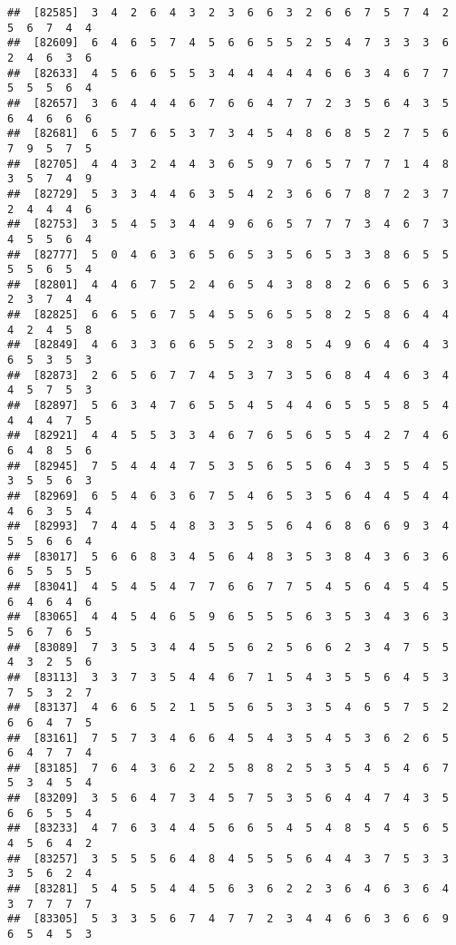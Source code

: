 \documentclass[
]{book}
\begin{document}
\begin{verbatim}
##  [82585]  3  4  2  6  4  3  2  3  6  6  3  2  6  6  7  5  7  4  2  5  6  7  4  4
##  [82609]  6  4  6  5  7  4  5  6  6  5  5  2  5  4  7  3  3  3  6  2  4  6  3  6
##  [82633]  4  5  6  6  5  5  3  4  4  4  4  4  6  6  3  4  6  7  7  5  5  5  6  4
##  [82657]  3  6  4  4  4  6  7  6  6  4  7  7  2  3  5  6  4  3  5  6  4  6  6  6
##  [82681]  6  5  7  6  5  3  7  3  4  5  4  8  6  8  5  2  7  5  6  7  9  5  7  5
##  [82705]  4  4  3  2  4  4  3  6  5  9  7  6  5  7  7  7  1  4  8  3  5  7  4  9
##  [82729]  5  3  3  4  4  6  3  5  4  2  3  6  6  7  8  7  2  3  7  2  4  4  4  6
##  [82753]  3  5  4  5  3  4  4  9  6  6  5  7  7  7  3  4  6  7  3  4  5  5  6  4
##  [82777]  5  0  4  6  3  6  5  6  5  3  5  6  5  3  3  8  6  5  5  5  5  6  5  4
##  [82801]  4  4  6  7  5  2  4  6  5  4  3  8  8  2  6  6  5  6  3  2  3  7  4  4
##  [82825]  6  6  5  6  7  5  4  5  5  6  5  5  8  2  5  8  6  4  4  4  2  4  5  8
##  [82849]  4  6  3  3  6  6  5  5  2  3  8  5  4  9  6  4  6  4  3  6  5  3  5  3
##  [82873]  2  6  5  6  7  7  4  5  3  7  3  5  6  8  4  4  6  3  4  4  5  7  5  3
##  [82897]  5  6  3  4  7  6  5  5  4  5  4  4  6  5  5  5  8  5  4  4  4  4  7  5
##  [82921]  4  4  5  5  3  3  4  6  7  6  5  6  5  5  4  2  7  4  6  6  4  8  5  6
##  [82945]  7  5  4  4  4  7  5  3  5  6  5  5  6  4  3  5  5  4  5  3  5  5  6  3
##  [82969]  6  5  4  6  3  6  7  5  4  6  5  3  5  6  4  4  5  4  4  4  6  3  5  4
##  [82993]  7  4  4  5  4  8  3  3  5  5  6  4  6  8  6  6  9  3  4  5  5  6  6  4
##  [83017]  5  6  6  8  3  4  5  6  4  8  3  5  3  8  4  3  6  3  6  6  5  5  5  5
##  [83041]  4  5  4  5  4  7  7  6  6  7  7  5  4  5  6  4  5  4  5  6  4  6  4  6
##  [83065]  4  4  5  4  6  5  9  6  5  5  5  6  3  5  3  4  3  6  3  5  6  7  6  5
##  [83089]  7  3  5  3  4  4  5  5  6  2  5  6  6  2  3  4  7  5  5  4  3  2  5  6
##  [83113]  3  3  7  3  5  4  4  6  7  1  5  4  3  5  5  6  4  5  3  7  5  3  2  7
##  [83137]  4  6  6  5  2  1  5  5  6  5  3  3  5  4  6  5  7  5  2  6  6  4  7  5
##  [83161]  7  5  7  3  4  6  6  4  5  4  3  5  4  5  3  6  2  6  5  6  4  7  7  4
##  [83185]  7  6  4  3  6  2  2  5  8  8  2  5  3  5  4  5  4  6  7  5  3  4  5  4
##  [83209]  3  5  6  4  7  3  4  5  7  5  3  5  6  4  4  7  4  3  5  6  6  5  5  4
##  [83233]  4  7  6  3  4  4  5  6  6  5  4  5  4  8  5  4  5  6  5  4  5  6  4  2
##  [83257]  3  5  5  5  6  4  8  4  5  5  5  6  4  4  3  7  5  3  3  3  5  6  2  4
##  [83281]  5  4  5  5  4  4  5  6  3  6  2  2  3  6  4  6  3  6  4  3  7  7  7  7
##  [83305]  5  3  3  5  6  7  4  7  7  2  3  4  4  6  6  3  6  6  9  6  5  4  5  3

\end{verbatim}
\end{document}
